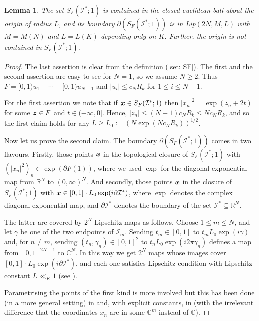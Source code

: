 \documentclass[11pt]{amsart}
\newtheorem{lemma}{Lemma}[section]
\numberwithin{equation}{eqncounter}
\def\IR{\mathbb R}
\def\IC{\mathbb C}
\def\I{\mathcal{I}}
\renewcommand{\vec}[1]{\mbox{\boldmath$#1$}}
\def\bx{\vec{x}}
\def\bz{\vec{z}}
\begin{document}
\begin{lemma}\label{lem: Lip}
The set  $S_F(\I^*;1)$  is contained in the closed euclidean ball about the origin of radius $L$, and its boundary $\partial(S_F(\I^*;1))$ is in Lip$(2N,M,L)$ with $M=M(N)$ and $L=L(K)$ depending only on $K$. Further, the origin is not contained in $S_F(\I^*;1)$.
\end{lemma}
\begin{proof}
The last assertion is clear from the definition (\ref{set: SF}). 
The first and the second assertion are easy to see for $N=1$, so we assume $N\geq 2$. 
Thus $F=[0,1)u_1+\cdots +[0,1)u_{N-1}$ and $|u_i|\leq c_N R_k$ for $1\leq i \leq N-1$.

For the first assertion we note that if $\bx\in S_F(\I^*;1)$ then $|x_n|^2=\exp(z_n+2t)$ for some $\bz\in F$ and $t\in (-\infty,0]$.
Hence,  $|z_n|\leq (N-1)c_N R_k\leq Nc_NR_k$, and so the first claim holds for any 
$L\geq L_0:=(N\exp(Nc_NR_k))^{1/2}$.

Now let us prove the second claim. 
The boundary $\partial(S_F(\I^*;1))$ comes in two flavours. Firstly, those points 
$\bx$ in the topological closure of $S_F(\I^*;1)$
with $(|x_n|^2)_n\in \exp(\partial F(1))$, where we used $\exp$ for the diagonal exponential map from $\IR^{N}$ to $(0,\infty)^N$. And secondly, those points $\bx$ in the closure of $S_F(\I^*;1)$
with $\bx \in [0,1]\cdot L_0\exp(i\partial \I^*)$, where $\exp$ denotes the complex  diagonal exponential map,
and $\partial \I^*$ denotes the boundary of the set $\I^*\subseteq \IR^N$.

The latter are covered by $2^N$ Lipschitz maps as follows. Choose $1\leq m\leq N$, and
let $\gamma$ be one of the two endpoints of $\I_m$. Sending $t_m\in [0,1]$ to $t_m L_0\exp(i\gamma)$ and, for
$n\neq m$, sending $(t_n,\gamma_n)\in [0,1]^2$ to $t_nL_0\exp(i2\pi \gamma_n)$ defines a map from $[0,1]^{2N-1}$ to $\IC^N$.  In this way we get $2^N$ maps whose images cover 
$[0,1]\cdot L_0\exp(i\partial \I^*)$,
and each one satisfies Lipschitz condition with Lipschitz constant $L\ll_K 1$ (see \cite[(1)-(3) Appendix A]{art1}).
 
Parametrising the  points of the first kind is more involved but this has been done (in a more general setting)
in \cite[Lemma 3]{MasserVaaler2} and, with explicit constants, in \cite[Lemma A.1]{art1} (with the irrelevant difference that  the coordinates $x_n$ are in some $\IC^{m}$ instead of $\IC$).
\end{proof}
\end{document}
